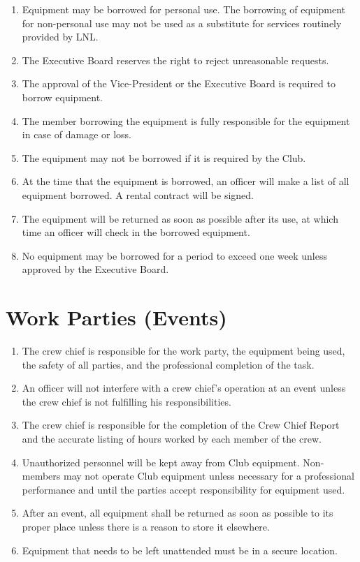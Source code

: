 \documentclass[12pt,letterpaper]{book}
\begin{document}
\begin{enumerate}

\item Equipment may be borrowed for personal use. The borrowing of equipment for non-personal use may not be used as a substitute for services routinely provided by LNL.
\item The Executive Board reserves the right to reject unreasonable requests.
\item The approval of the Vice-President or the Executive Board is required to borrow equipment.
\item The member borrowing the equipment is fully responsible for the equipment in case of damage or loss.
\item The equipment may not be borrowed if it is required by the Club.
\item At the time that the equipment is borrowed, an officer will make a list of all equipment borrowed. A rental contract will be signed.
\item The equipment will be returned as soon as possible after its use, at which time an officer will check in the borrowed equipment.
\item No equipment may be borrowed for a period to exceed one week unless approved by the Executive Board.

\end{enumerate}

\section{Work Parties (Events)}

\begin{enumerate}

\item The crew chief is responsible for the work party, the equipment being used, the safety of all parties, and the professional completion of the task.
\item An officer will not interfere with a crew chief's operation at an event unless the crew chief is not fulfilling his responsibilities.
\item The crew chief is responsible for the completion of the Crew Chief Report and the accurate listing of hours worked by each member of the crew.
\item Unauthorized personnel will be kept away from Club equipment. Non-members may not operate Club equipment unless necessary for a professional performance and until the parties accept responsibility for equipment used.
\item After an event, all equipment shall be returned as soon as possible to its proper place unless there is a reason to store it elsewhere.
\item Equipment that needs to be left unattended must be in a secure location. 

\end{enumerate}
\end{document}
